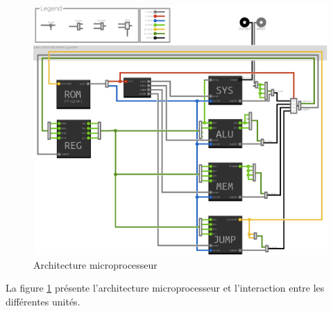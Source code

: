 \documentclass{article}
\begin{document}
\begin{figure}[h]
\includegraphics{archi.eps}
\caption{\label{archi} Architecture microprocesseur}
\end{figure}
La figure \ref{archi} présente l'architecture microprocesseur et l'interaction
entre les différentes unités.
\end{document}
